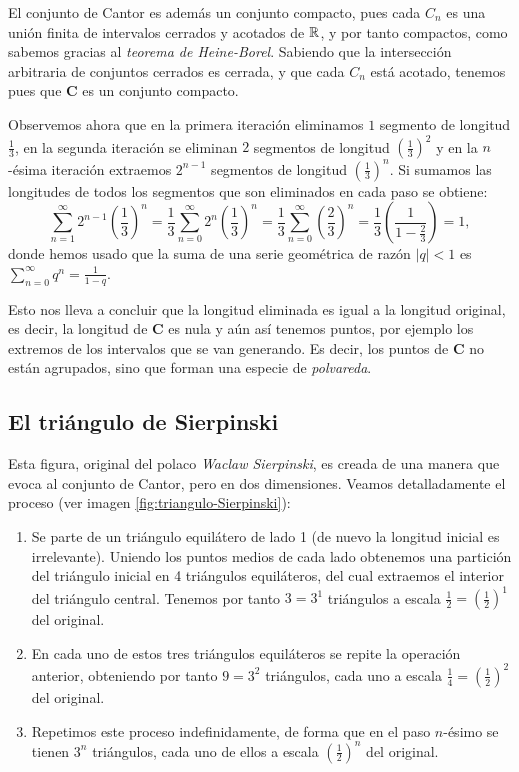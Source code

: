 El conjunto de Cantor es además un conjunto compacto, pues cada $C_n$ es una unión finita de intervalos cerrados y acotados de $\mathbb{R}$, y por tanto compactos, como sabemos gracias al \textit{teorema de Heine-Borel}. Sabiendo que la intersección arbitraria de conjuntos cerrados es cerrada, y que cada $C_n$ está acotado, tenemos pues que $\mathbf{C}$ es un conjunto compacto.

Observemos ahora que en la primera iteración eliminamos $1$ segmento de longitud $\frac 1 3$, en la segunda iteración se eliminan $2$ segmentos de longitud $\left(\frac{1}{3}\right)^2$ y en la $n$-ésima iteración extraemos $2^{n-1}$ segmentos de longitud $\left(\frac{1}{3}\right)^n$. Si sumamos las longitudes de todos los segmentos que son eliminados en cada paso se obtiene:
$$
\sum_{n=1}^\infty 2^{n-1}\left(\frac 1 3\right)^n  = \frac 1 3  \sum_{n=0}^\infty 2^n\left(\frac 1 3\right)^n =  \frac 1 3  \sum_{n=0}^\infty \left(\frac 2 3\right)^n = \frac{1}{3} \left(\frac{1}{1-\frac{2}{3}}\right) = 1,
$$
donde hemos usado que la suma de una serie geométrica de razón $|q|<1$ es $\sum_{n=0}^\infty q^n = \frac{1}{1-q}$.

Esto nos lleva a concluir que la longitud eliminada es igual a la longitud original, es decir, la longitud de $\mathbf C$ es nula y aún así tenemos puntos, por ejemplo los extremos de los intervalos que se van generando. Es decir, los puntos de $\mathbf{C}$ no están agrupados, sino que forman una especie de \textit{polvareda}.

\subsection{El triángulo de Sierpinski}
\label{subsection:triangulo-Sierpinski} 

Esta figura, original del polaco \textit{Waclaw Sierpinski}, es creada de una manera que evoca al conjunto de Cantor, pero en dos dimensiones. Veamos detalladamente el proceso (ver imagen \ref{fig:triangulo-Sierpinski}):

\begin{enumerate}
\item Se parte de un triángulo equilátero de lado 1 (de nuevo la longitud inicial es irrelevante). Uniendo los puntos medios de cada lado obtenemos una partición del triángulo inicial en 4 triángulos equiláteros, del cual extraemos el interior del triángulo central. Tenemos por tanto $3=3^1$ triángulos a escala $\frac 1 2 = \left(\frac 1 2\right)^1$ del original.

\item En cada uno de estos tres triángulos equiláteros se repite la operación anterior, obteniendo por tanto $9=3^2$ triángulos, cada uno a escala $\frac 1 4 = \left(\frac 1 2\right)^2$ del original.

\item Repetimos este proceso indefinidamente, de forma que en el paso $n$-ésimo se tienen $3^n$ triángulos, cada uno de ellos a escala $\left(\frac 1 2\right)^n$ del original.
\end{enumerate}

